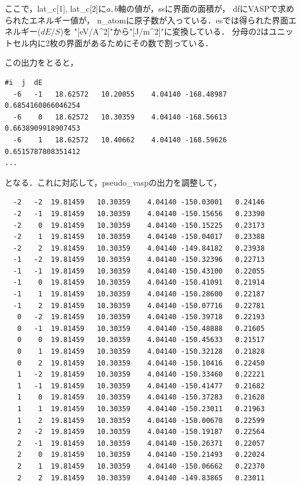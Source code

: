 ここで，lat\_c{[}1{]},
lat\_c{[}2{]}に\(a,b\)軸の値が，ssに界面の面積が，
dfにVASPで求められたエネルギー値が，
n\_atomに原子数が入っている．esでは得られた界面エネルギー(\(dE/S\))を
"{[}eV/A\^{}2{]}"から"{[}J/m\^{}2{]}"に変換している．
分母の2はユニットセル内に2枚の界面があるためにその数で割っている．

この出力をとると，

\begin{verbatim}
#i  j  dE  
  -6   -1   18.62572   10.20055    4.04140 -168.48987 0.6854160866046254
  -6    0   18.62572   10.30359    4.04140 -168.56613 0.6638909918907453
  -6    1   18.62572   10.40662    4.04140 -168.59626 0.6515787808351412
...
\end{verbatim}

となる．これに対応して，pseudo\_vaspの出力を調整して，

\begin{verbatim}
  -2   -2  19.81459   10.30359    4.04140 -150.03001   0.24146     
  -2   -1  19.81459   10.30359    4.04140 -150.15656   0.23390     
  -2    0  19.81459   10.30359    4.04140 -150.15225   0.23173     
  -2    1  19.81459   10.30359    4.04140 -150.04017   0.23388     
  -2    2  19.81459   10.30359    4.04140 -149.84182   0.23938     
  -1   -2  19.81459   10.30359    4.04140 -150.32396   0.22713     
  -1   -1  19.81459   10.30359    4.04140 -150.43100   0.22055     
  -1    0  19.81459   10.30359    4.04140 -150.41091   0.21914     
  -1    1  19.81459   10.30359    4.04140 -150.28600   0.22187     
  -1    2  19.81459   10.30359    4.04140 -150.07716   0.22781     
   0   -2  19.81459   10.30359    4.04140 -150.39718   0.22193     
   0   -1  19.81459   10.30359    4.04140 -150.48888   0.21605     
   0    0  19.81459   10.30359    4.04140 -150.45633   0.21517     
   0    1  19.81459   10.30359    4.04140 -150.32128   0.21828     
   0    2  19.81459   10.30359    4.04140 -150.10416   0.22450     
   1   -2  19.81459   10.30359    4.04140 -150.33460   0.22221     
   1   -1  19.81459   10.30359    4.04140 -150.41477   0.21682     
   1    0  19.81459   10.30359    4.04140 -150.37283   0.21628     
   1    1  19.81459   10.30359    4.04140 -150.23011   0.21963     
   1    2  19.81459   10.30359    4.04140 -150.00670   0.22599     
   2   -2  19.81459   10.30359    4.04140 -150.19187   0.22564     
   2   -1  19.81459   10.30359    4.04140 -150.26371   0.22057     
   2    0  19.81459   10.30359    4.04140 -150.21493   0.22024     
   2    1  19.81459   10.30359    4.04140 -150.06662   0.22370     
   2    2  19.81459   10.30359    4.04140 -149.83865   0.23011
\end{verbatim}

